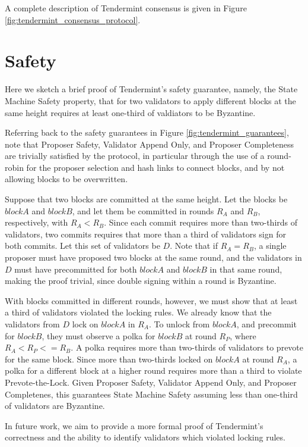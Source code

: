 A complete description of Tendermint consensus is given in Figure \ref{fig:tendermint_consensus_protocol}.

\section{Safety}

Here we sketch a brief proof of Tendermint's safety guarantee, namely, 
the State Machine Safety property, that for two validators to apply different blocks at the same height
requires at least one-third of valdiators to be Byzantine.

Referring back to the safety guarantees in Figure \ref{fig:tendermint_guarantees}, 
note that Proposer Safety, Validator Append Only, and Proposer Completeness are trivially satisfied by the protocol, 
in particular through the use of a round-robin for the proposer selection and hash links to connect blocks,
and by not allowing blocks to be overwritten.

Suppose that two blocks are committed at the same height.
Let the blocks be $blockA$ and $blockB$, and let them be committed in rounds $R_A$ and $R_B$, respectively, with $R_A < R_B$.
Since each commit requires more than two-thirds of validators, 
two commits requires that more than a third of validators sign for both commits.
Let this set of validators be $D$.
Note that if $R_A = R_B$, a single proposer must have proposed two blocks at the same round, 
and the validators in $D$ must have precommitted for both $blockA$ and $blockB$ in that same round, 
making the proof trivial, since double signing within a round is Byzantine.

With blocks committed in different rounds, however, 
we must show that at least a third of validators violated the locking rules.
We already know that the validators from $D$ lock on $blockA$ in $R_A$.
To unlock from $blockA$, and precommit for $blockB$, 
they must observe a polka for $blockB$ at round $R_P$, where $R_A < R_P <= R_B$.
A polka requires more than two-thirds of validators to prevote for the same block.
Since more than two-thirds locked on $blockA$ at round $R_A$, 
a polka for a different block at a higher round requires more than a third to violate Prevote-the-Lock.
Given Proposer Safety, Validator Append Only, and Proposer Completenes,
this guarantees State Machine Safety assuming less than one-third of validators are Byzantine.

In future work, we aim to provide a more formal proof of Tendermint's correctness 
and the ability to identify validators which violated locking rules.


